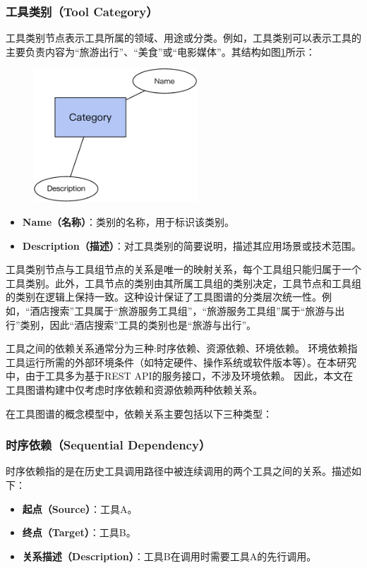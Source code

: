 \subsubsection{工具类别（Tool Category）}
工具类别节点表示工具所属的领域、用途或分类。例如，工具类别可以表示工具的主要负责内容为“旅游出行”、“美食”或“电影媒体”。其结构如图\ref{fig:ch3-kg-category}所示：

\begin{figure}[H]
    \vspace{1em}
    \centering
    \setlength{\abovecaptionskip}{10pt} %
    \includegraphics[height=5cm]{../assets/图谱格式-category.pdf}
    \label{fig:ch3-kg-category}
  \end{figure}

\begin{itemize}
    \item \textbf{Name（名称）}：类别的名称，用于标识该类别。
    \item \textbf{Description（描述）}：对工具类别的简要说明，描述其应用场景或技术范围。
\end{itemize}

工具类别节点与工具组节点的关系是唯一的映射关系，每个工具组只能归属于一个工具类别。此外，工具节点的类别由其所属工具组的类别决定，工具节点和工具组的类别在逻辑上保持一致。这种设计保证了工具图谱的分类层次统一性。例如，“酒店搜索”工具属于“旅游服务工具组”，“旅游服务工具组”属于“旅游与出行”类别，因此“酒店搜索”工具的类别也是“旅游与出行”。


工具之间的依赖关系通常分为三种\cite{shen2023taskbench}:时序依赖、资源依赖、环境依赖。
环境依赖指工具运行所需的外部环境条件（如特定硬件、操作系统或软件版本等）。在本研究中，由于工具多为基于REST API的服务接口，不涉及环境依赖。
因此，本文在工具图谱构建中仅考虑时序依赖和资源依赖两种依赖关系。

在工具图谱的概念模型中，依赖关系主要包括以下三种类型：

\subsubsection{时序依赖（Sequential Dependency）}
时序依赖指的是在历史工具调用路径中被连续调用的两个工具之间的关系。描述如下：
\begin{itemize}
    \item \textbf{起点（Source）}：工具A。
    \item \textbf{终点（Target）}：工具B。
    \item \textbf{关系描述（Description）}：工具B在调用时需要工具A的先行调用。
\end{itemize}

